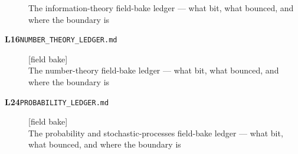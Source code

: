 \begin{description}
The information-theory field-bake ledger --- what bit, what bounced, and where the boundary is
\item[\ldglabel{number_theory}{L16}\textbf{L16}\quad\texttt{NUMBER\_THEORY\_LEDGER.md}]\hfill\textsf{[field bake]}\\
The number-theory field-bake ledger --- what bit, what bounced, and where the boundary is
\item[\ldglabel{probability}{L24}\textbf{L24}\quad\texttt{PROBABILITY\_LEDGER.md}]\hfill\textsf{[field bake]}\\
The probability and stochastic-processes field-bake ledger --- what bit, what bounced, and where the boundary is
\end{description}
\endgroup

